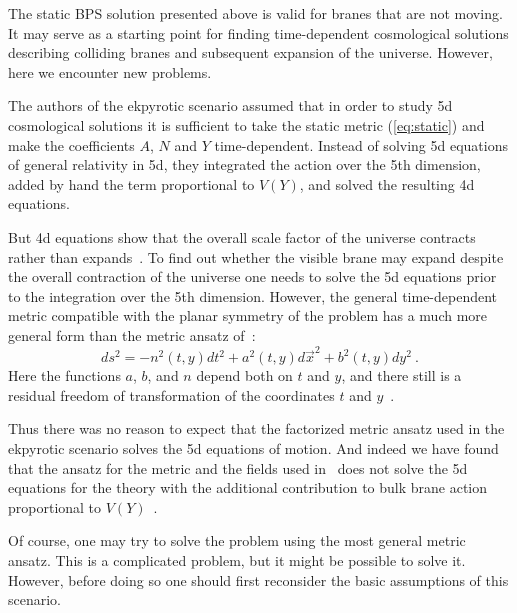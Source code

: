 \documentclass[a4paper,12pt]{article}
\begin{document}
The static BPS solution presented above is valid for branes that are not moving. It  may serve as a starting point for finding time-dependent cosmological   
solutions describing colliding branes and subsequent expansion of the universe.   However, here we encounter new problems.

The authors of the ekpyrotic scenario assumed that in order to study 5d cosmological solutions it is sufficient to take the static metric (\ref{eq:static}) and make the coefficients $A$, $N$ and $Y$ time-dependent. Instead of solving 5d equations of general relativity in 5d, they integrated the action over the 5th dimension, added by hand the term proportional to $V(Y)$, and solved the resulting 4d equations.

But 4d equations show that the overall scale factor of the universe contracts rather than expands~\cite{KOST,KKLT}. To find out whether the visible brane may expand despite the overall contraction of the universe one  needs to solve the 5d equations prior to the integration over the 5th dimension. However, the general time-dependent  metric compatible with the planar symmetry of the problem  has a much more general form than the metric ansatz of~\cite{KOST}:
\begin{equation}\label{gener}   
ds^2= -n^2(t,y)dt^2+a^2(t,y)d{\vec x}^2+b^2(t,y)dy^2 \ .   
\end{equation}   
Here the functions $a$, $b$, and $n$ depend both on $t$ and $y$, and there still is a residual freedom of transformation of the coordinates $t$ and $y$~\cite{Binetruy:2000ut}.
 
Thus there was no reason to expect that the factorized  metric ansatz used in the ekpyrotic scenario solves the 5d equations of motion. And indeed we have found that 
 the ansatz for the metric and the fields used in~\cite{KOST} does not solve the 5d equations for the theory with the additional contribution to  bulk brane action proportional to $V(Y)$~\cite{KKLT}. 
 
Of course, one may try to solve the problem using the most general metric ansatz. This is a complicated problem, but it might be possible to solve it. However, before doing so one should first reconsider the basic assumptions of this scenario. 
\end{document}
